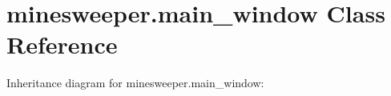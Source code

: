 \hypertarget{classminesweeper_1_1main__window}{}\section{minesweeper.\+main\+\_\+window Class Reference}
\label{classminesweeper_1_1main__window}


Inheritance diagram for minesweeper.\+main\+\_\+window\+:
